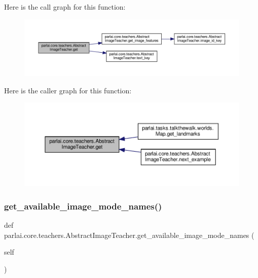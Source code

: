 Here is the call graph for this function\+:
\nopagebreak
\begin{figure}[H]
\begin{center}
\leavevmode
\includegraphics[width=350pt]{classparlai_1_1core_1_1teachers_1_1AbstractImageTeacher_ae2f395708462355b28888be7a434ebf4_cgraph}
\end{center}
\end{figure}
Here is the caller graph for this function\+:
\nopagebreak
\begin{figure}[H]
\begin{center}
\leavevmode
\includegraphics[width=350pt]{classparlai_1_1core_1_1teachers_1_1AbstractImageTeacher_ae2f395708462355b28888be7a434ebf4_icgraph}
\end{center}
\end{figure}
\mbox{\label{classparlai_1_1core_1_1teachers_1_1AbstractImageTeacher_ab64513ca6c2b1c358f180ee0846b26e0}} 
\subsubsection{\texorpdfstring{get\+\_\+available\+\_\+image\+\_\+mode\+\_\+names()}{get\_available\_image\_mode\_names()}}
{\footnotesize\ttfamily def parlai.\+core.\+teachers.\+Abstract\+Image\+Teacher.\+get\+\_\+available\+\_\+image\+\_\+mode\+\_\+names (\begin{DoxyParamCaption}\item[{}]{self }\end{DoxyParamCaption})}

